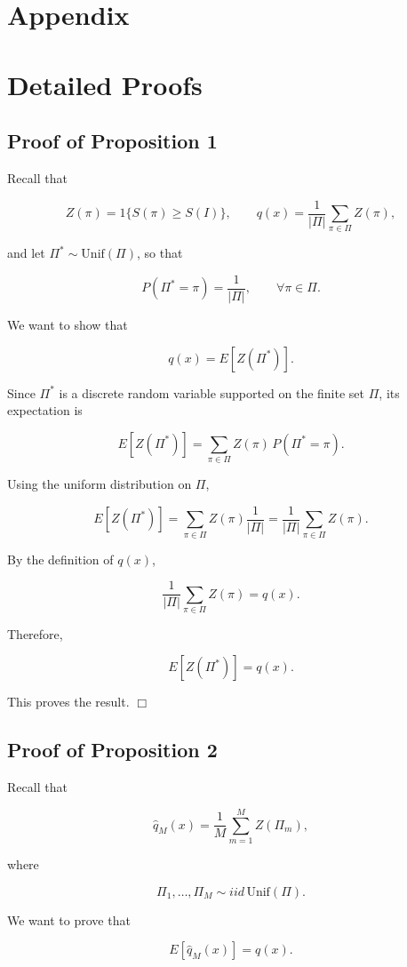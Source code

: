 \documentclass{article}
\begin{document}
\section{Appendix}
\appendix
\section{Detailed Proofs}

\subsection{Proof of Proposition 1}

Recall that

\[
Z(\pi)=1\{S(\pi)\ge S(I)\}, \qquad q(x)=\frac{1}{|\Pi|}\sum_{\pi\in\Pi} Z(\pi),
\]

and let $\Pi^* \sim \mathrm{Unif}(\Pi)$, so that

\[
P(\Pi^*=\pi)=\frac{1}{|\Pi|}, \qquad \forall \pi\in\Pi.
\]

We want to show that

\[
q(x)=E[Z(\Pi^*)].
\]

Since $\Pi^*$ is a discrete random variable supported on the finite set $\Pi$, its expectation is

\[
E[Z(\Pi^*)]
=
\sum_{\pi\in\Pi} Z(\pi)\,P(\Pi^*=\pi).
\]

Using the uniform distribution on $\Pi$,

\[
E[Z(\Pi^*)]
=
\sum_{\pi\in\Pi} Z(\pi)\frac{1}{|\Pi|}
=
\frac{1}{|\Pi|}\sum_{\pi\in\Pi} Z(\pi).
\]

By the definition of $q(x)$,

\[
\frac{1}{|\Pi|}\sum_{\pi\in\Pi} Z(\pi)=q(x).
\]

Therefore,

\[
E[Z(\Pi^*)]=q(x).
\]

This proves the result. \hfill $\Box$

\subsection{Proof of Proposition 2}

Recall that

\[
\hat{q}_M(x)=\frac{1}{M}\sum_{m=1}^M Z(\Pi_m),
\]

where

\[
\Pi_1,\ldots,\Pi_M \sim iid\,\mathrm{Unif}(\Pi).
\]

We want to prove that

\[
E[\hat{q}_M(x)]=q(x).
\]
\end{document}
